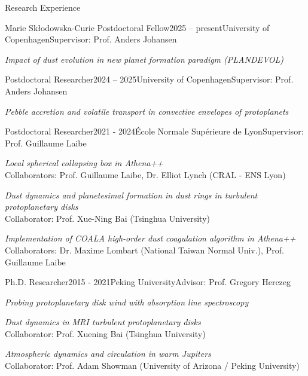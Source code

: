 \documentclass{resume} %
\begin{document}
\begin{rSection}{Research Experience}

\begin{rSubsection}{Marie Skłodowska-Curie Postdoctoral Fellow}{2025 -- present}{University of Copenhagen}{Supervisor: Prof. Anders Johansen}
\item \emph{Impact of dust evolution in new planet formation paradigm (PLANDEVOL)}
\end{rSubsection}

\begin{rSubsection}{Postdoctoral Researcher}{2024 -- 2025}{University of Copenhagen}{Supervisor: Prof. Anders Johansen}
\item \emph{{Pebble accretion and volatile transport in convective envelopes of protoplanets}}
\end{rSubsection}

\begin{rSubsection}{Postdoctoral Researcher}{2021 - 2024}{\'Ecole Normale Sup\'erieure de Lyon}{Supervisor: Prof. Guillaume Laibe}
\item \emph{{Local spherical collapsing box in Athena++}}\\
Collaborators: Prof. Guillaume Laibe, Dr. Elliot Lynch (CRAL - ENS Lyon)
\item \emph{{Dust dynamics and planetesimal formation in dust rings in turbulent protoplanetary disks}}\\
Collaborator: Prof. Xue-Ning Bai (Tsinghua University)
\item \emph{{Implementation of COALA high-order dust coagulation algorithm in Athena++}}\\
Collaborators: Dr. Maxime Lombart (National Taiwan Normal Univ.), Prof. Guillaume Laibe
\end{rSubsection}

\begin{rSubsection}{Ph.D. Researcher}{2015 - 2021}{Peking University}{Advisor: Prof. Gregory Herczeg}
\item \emph{{Probing protoplanetary disk wind with absorption line spectroscopy}}
\item \emph{{Dust dynamics in MRI turbulent protoplanetary disks}}\\
Collaborator: Prof. Xuening Bai (Tsinghua University)
\item \emph{{Atmospheric dynamics and circulation in warm Jupiters}}\\
Collaborator: Prof. Adam Showman (University of Arizona / Peking University)
\end{rSubsection}


\end{rSection}
\end{document}
